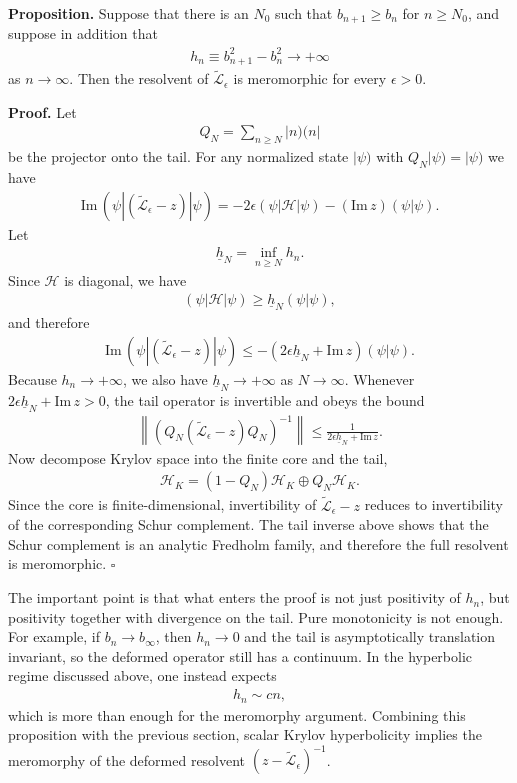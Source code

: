 \documentclass[JHEP,12pt]{article}
\begin{document}
\medskip
\noindent
\textbf{Proposition.} Suppose that there is an $N_0$ such that $b_{n+1}\ge b_n$ for $n\ge N_0$, and suppose in addition that
\begin{align}
h_n\equiv b_{n+1}^2-b_n^2\longrightarrow +\infty
\end{align}
as $n\to \infty$. Then the resolvent of $\widetilde{\mathcal{L}}_\epsilon$ is meromorphic for every $\epsilon>0$.

\medskip
\noindent
\textbf{Proof.} Let
\begin{align}
Q_N=\sum_{n\ge N}|n)(n|
\end{align}
be the projector onto the tail. For any normalized state $|\psi)$ with $Q_N|\psi)=|\psi)$ we have
\begin{align}
\mathrm{Im}\,(\psi|(\widetilde{\mathcal{L}}_\epsilon-z)|\psi)
=-2\epsilon(\psi|\mathcal{H}|\psi)-(\mathrm{Im}\,z)(\psi|\psi).
\end{align}
Let
\begin{align}
\underline{h}_N=\inf_{n\ge N} h_n.
\end{align}
Since $\mathcal{H}$ is diagonal, we have
\begin{align}
(\psi|\mathcal{H}|\psi)\ge \underline{h}_N(\psi|\psi),
\end{align}
and therefore
\begin{align}
\mathrm{Im}\,(\psi|(\widetilde{\mathcal{L}}_\epsilon-z)|\psi)
\le -(2\epsilon \underline{h}_N+\mathrm{Im}\,z)(\psi|\psi).
\end{align}
Because $h_n\to +\infty$, we also have $\underline{h}_N\to +\infty$ as $N\to \infty$. Whenever $2\epsilon \underline{h}_N+\mathrm{Im}\,z>0$, the tail operator is invertible and obeys the bound
\begin{align}
\left\| \left(Q_N(\widetilde{\mathcal{L}}_\epsilon-z)Q_N\right)^{-1}\right\|
\le \frac{1}{2\epsilon \underline{h}_N+\mathrm{Im}\,z}.
\end{align}
Now decompose Krylov space into the finite core and the tail,
\begin{align}
\mathcal{H}_K=(1-Q_N)\mathcal{H}_K\oplus Q_N\mathcal{H}_K.
\end{align}
Since the core is finite-dimensional, invertibility of $\widetilde{\mathcal{L}}_\epsilon-z$ reduces to invertibility of the corresponding Schur complement. The tail inverse above shows that the Schur complement is an analytic Fredholm family, and therefore the full resolvent is meromorphic.
\hfill $\square$

\medskip
The important point is that what enters the proof is not just positivity of $h_n$, but positivity together with divergence on the tail. Pure monotonicity is not enough. For example, if $b_n\to b_\infty$, then $h_n\to 0$ and the tail is asymptotically translation invariant, so the deformed operator still has a continuum. In the hyperbolic regime discussed above, one instead expects
\begin{align}
h_n\sim cn,
\end{align}
which is more than enough for the meromorphy argument. Combining this proposition with the previous section, scalar Krylov hyperbolicity implies the meromorphy of the deformed resolvent $\left(z-\widetilde{\mathcal{L}}_\epsilon\right)^{-1}$.
\end{document}
